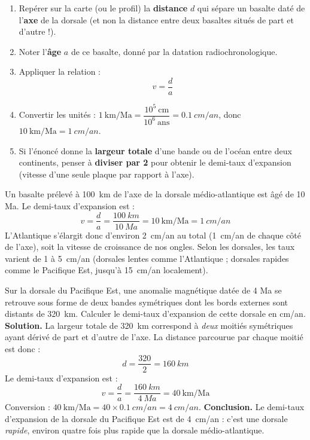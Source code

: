 \documentclass[11pt]{article}
\begin{document}
\begin{methode}
\begin{enumerate}
\item Repérer sur la carte (ou le profil) la \textbf{distance} $d$ qui sépare un basalte daté de l'\textbf{axe} de la dorsale (et non la distance entre deux basaltes situés de part et d'autre !).
\item Noter l'\textbf{âge} $a$ de ce basalte, donné par la datation radiochronologique.
\item Appliquer la relation : \[ v = \dfrac{d}{a} \]
\item Convertir les unités : $1\ \mathrm{km/Ma} = \dfrac{10^{5}\ \mathrm{cm}}{10^{6}\ \mathrm{ans}} = \SI{0,1}{cm/an}$, donc $10\ \mathrm{km/Ma} = \SI{1}{cm/an}$.
\item Si l'énoncé donne la \textbf{largeur totale} d'une bande ou de l'océan entre deux continents, penser à \textbf{diviser par 2} pour obtenir le demi-taux d'expansion (vitesse d'une seule plaque par rapport à l'axe).
\end{enumerate}
\end{methode}

\begin{exemplebox}
Un basalte prélevé à \SI{100}{km} de l'axe de la dorsale médio-atlantique est âgé de 10 Ma. Le demi-taux d'expansion est :
\[ v = \dfrac{d}{a} = \dfrac{\SI{100}{km}}{\SI{10}{Ma}} = 10\ \mathrm{km/Ma} = \SI{1}{cm/an} \]
L'Atlantique s'élargit donc d'environ \SI{2}{cm/an} au total (\SI{1}{cm/an} de chaque côté de l'axe), soit la vitesse de croissance de nos ongles. Selon les dorsales, les taux varient de 1 à \SI{5}{cm/an} (dorsales lentes comme l'Atlantique ; dorsales rapides comme le Pacifique Est, jusqu'à \SI{15}{cm/an} localement).
\end{exemplebox}

\begin{exoresolu}
Sur la dorsale du Pacifique Est, une anomalie magnétique datée de 4 Ma se retrouve sous forme de deux bandes symétriques dont les bords externes sont distants de \SI{320}{km}. Calculer le demi-taux d'expansion de cette dorsale en cm/an.
\tcblower
\textbf{Solution.} La largeur totale de \SI{320}{km} correspond à \emph{deux} moitiés symétriques ayant dérivé de part et d'autre de l'axe. La distance parcourue par chaque moitié est donc :
\[ d = \dfrac{320}{2} = \SI{160}{km} \]
Le demi-taux d'expansion est :
\[ v = \dfrac{d}{a} = \dfrac{\SI{160}{km}}{\SI{4}{Ma}} = 40\ \mathrm{km/Ma} \]
Conversion : $40\ \mathrm{km/Ma} = 40 \times \SI{0,1}{cm/an} = \SI{4}{cm/an}$.
\textbf{Conclusion.} Le demi-taux d'expansion de la dorsale du Pacifique Est est de \SI{4}{cm/an} : c'est une dorsale \emph{rapide}, environ quatre fois plus rapide que la dorsale médio-atlantique.
\end{exoresolu}
\end{document}
